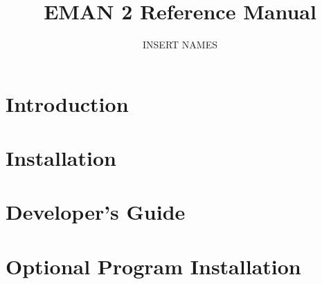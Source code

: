 \documentclass{report}
\title{EMAN 2 Reference Manual}
\author{INSERT NAMES}
\date{}
\begin{document}
\maketitle


%
\setcounter{tocdepth}{2}
\tableofcontents

\chapter{Introduction} 




\chapter{Installation} \label{INSTALL} 


%

\chapter{Developer's Guide} 
  \label{DEVELOPERS-GUIDE} 

 
 
 




 \label{MISC-DEVELOPERS-GUIDE}

%


\appendix

\chapter{Optional Program Installation} 


%


\printindex
\end{document}
